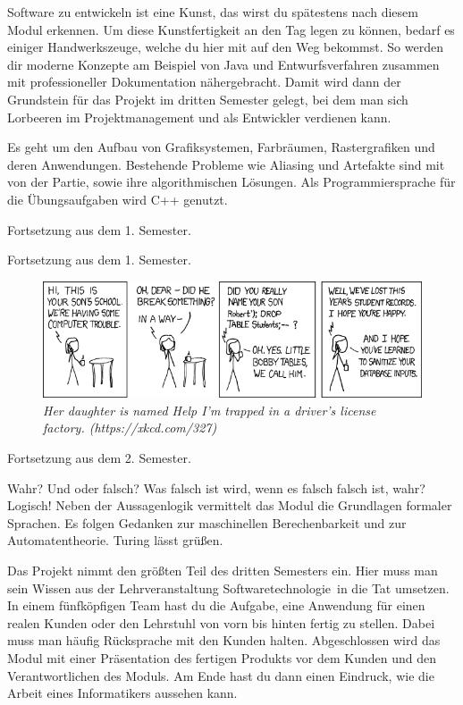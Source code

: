Software zu entwickeln ist eine Kunst, das wirst du spätestens nach diesem Modul erkennen.
Um diese Kunstfertigkeit an den Tag legen zu können, bedarf es einiger Handwerkszeuge, welche du hier mit auf den Weg bekommst.
So werden dir moderne Konzepte am Beispiel von Java und Entwurfsverfahren zusammen mit professioneller Dokumentation nähergebracht.
Damit wird dann der Grundstein für das Projekt im dritten Semester gelegt, bei dem man sich Lorbeeren im Projektmanagement und als Entwickler verdienen kann.

Es geht um den Aufbau von Grafiksystemen, Farbräumen, Rastergrafiken und deren Anwendungen.
Bestehende Probleme wie Aliasing und Artefakte sind mit von der Partie, sowie ihre algorithmischen Lösungen.
Als Programmiersprache für die Übungsaufgaben wird C++ genutzt.

Fortsetzung aus dem 1. Semester.

Fortsetzung aus dem 1. Semester.

\begin{figure}[h!]
\centering
\includegraphics[scale=.4]{img/xkcd/exploits_of_a_mom.png}
\caption*{{\small \textit{Her daughter is named Help I'm trapped in a driver's license factory. (https://xkcd.com/327)}}}
\end{figure}


Fortsetzung aus dem 2. Semester.

Wahr?
Und oder falsch?
Was falsch ist wird, wenn es falsch falsch ist, wahr?
Logisch!
Neben der Aussagenlogik vermittelt das Modul die Grundlagen formaler Sprachen.
Es folgen Gedanken zur maschinellen Berechenbarkeit und zur Automatentheorie.
Turing lässt grüßen.

Das Projekt nimmt den größten Teil des dritten Semesters ein.
Hier muss man sein Wissen aus der Lehrveranstaltung \glqq Softwaretechnologie\grqq\ in die Tat umsetzen.
In einem fünfköpfigen Team hast du die Aufgabe, eine Anwendung für einen realen Kunden oder den Lehrstuhl von vorn bis hinten fertig zu stellen.
Dabei muss man häufig Rücksprache mit den Kunden halten.
Abgeschlossen wird das Modul mit einer Präsentation des fertigen Produkts vor dem Kunden und den Verantwortlichen des Moduls.
Am Ende hast du dann einen Eindruck, wie die Arbeit eines Informatikers aussehen kann.

